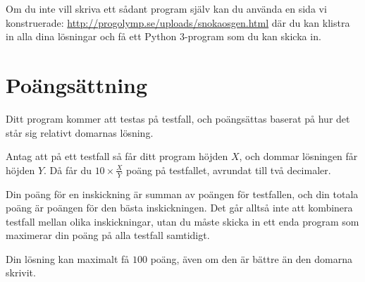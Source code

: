 Om du inte vill skriva ett sådant program själv kan du använda en sida vi konstruerade: \url{http://progolymp.se/uploads/snokaosgen.html} där du kan klistra in
alla dina lösningar och få ett Python 3-program som du kan skicka in.

\section*{Poängsättning}
Ditt program kommer att testas på testfall, och poängsättas baserat på hur det står sig relativt domarnas lösning.

Antag att på ett testfall så får ditt program höjden $X$, och dommar lösningen får höjden $Y$. Då får du $10 \times \frac{X}{Y}$ poäng på testfallet, avrundat till två decimaler.

Din poäng för en inskickning är summan av poängen för testfallen, och din totala poäng är poängen för den bästa inskickningen. Det går alltså inte att kombinera testfall mellan olika inskickningar, utan du måste skicka in ett enda program som maximerar din poäng på alla testfall samtidigt.

Din lösning kan maximalt få $100$ poäng, även om den är bättre än den domarna skrivit.
